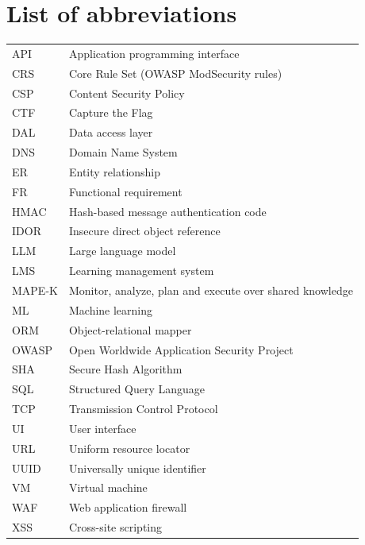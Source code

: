 \chapter*{List of abbreviations}

\begingroup
\renewcommand{\arraystretch}{1.2}
\begin{longtable}{@{}p{2.6cm}p{12.2cm}@{}}
API & Application programming interface\\
CRS & Core Rule Set (OWASP ModSecurity rules)\\
CSP & Content Security Policy\\
CTF & Capture the Flag\\
DAL & Data access layer\\
DNS & Domain Name System\\
ER & Entity relationship\\
FR & Functional requirement\\
HMAC & Hash-based message authentication code\\
IDOR & Insecure direct object reference\\
LLM & Large language model\\
LMS & Learning management system\\
MAPE-K & Monitor, analyze, plan and execute over shared knowledge\\
ML & Machine learning\\
ORM & Object-relational mapper\\
OWASP & Open Worldwide Application Security Project\\
SHA & Secure Hash Algorithm\\
SQL & Structured Query Language\\
TCP & Transmission Control Protocol\\
UI & User interface\\
URL & Uniform resource locator\\
UUID & Universally unique identifier\\
VM & Virtual machine\\
WAF & Web application firewall\\
XSS & Cross-site scripting\\
\end{longtable}
\endgroup
